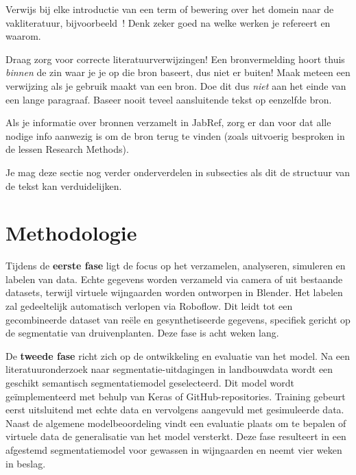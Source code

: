 Verwijs bij elke introductie van een term of bewering over het domein naar de vakliteratuur, bijvoorbeeld~\autocite{Hykes2013}! Denk zeker goed na welke werken je refereert en waarom.

Draag zorg voor correcte literatuurverwijzingen! Een bronvermelding hoort thuis \emph{binnen} de zin waar je je op die bron baseert, dus niet er buiten! Maak meteen een verwijzing als je gebruik maakt van een bron. Doe dit dus \emph{niet} aan het einde van een lange paragraaf. Baseer nooit teveel aansluitende tekst op eenzelfde bron.

Als je informatie over bronnen verzamelt in JabRef, zorg er dan voor dat alle nodige info aanwezig is om de bron terug te vinden (zoals uitvoerig besproken in de lessen Research Methods).


Je mag deze sectie nog verder onderverdelen in subsecties als dit de structuur van de tekst kan verduidelijken.

\section{Methodologie}%
\label{sec:methodologie}

Tijdens de \textbf{eerste fase} ligt de focus op het verzamelen, analyseren, simuleren en labelen van data. Echte gegevens worden verzameld via camera of uit bestaande datasets, terwijl virtuele wijngaarden worden ontworpen in Blender. Het labelen zal gedeeltelijk automatisch verlopen via Roboflow. Dit leidt tot een gecombineerde dataset van reële en gesynthetiseerde gegevens, specifiek gericht op de segmentatie van druivenplanten. Deze fase is acht weken lang.

De \textbf{tweede fase} richt zich op de ontwikkeling en evaluatie van het model. Na een literatuuronderzoek naar segmentatie-uitdagingen in landbouwdata wordt een geschikt semantisch segmentatiemodel geselecteerd. Dit model wordt geïmplementeerd met behulp van Keras of GitHub-repositories. Training gebeurt eerst uitsluitend met echte data en vervolgens aangevuld met gesimuleerde data. Naast de algemene modelbeoordeling vindt een evaluatie plaats om te bepalen of virtuele data de generalisatie van het model versterkt. Deze fase resulteert in een afgestemd segmentatiemodel voor gewassen in wijngaarden en neemt vier weken in beslag.

